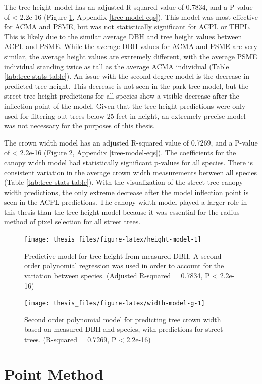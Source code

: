 \documentclass[12pt,twoside]{reedthesis}
\begin{document}
The tree height model has an adjusted R-squared value of 0.7834, and a P-value of \textless{} 2.2e-16 (Figure \ref{fig:height-model}, Appendix \ref{tree-model-eqs}). This model was most effective for ACMA and PSME, but was not statistically significant for ACPL or THPL. This is likely due to the similar average DBH and tree height values between ACPL and PSME. While the average DBH values for ACMA and PSME are very similar, the average height values are extremely different, with the average PSME individual standing twice as tall as the average ACMA individual (Table \ref{tab:tree-stats-table}). An issue with the second degree model is the decrease in predicted tree height. This decrease is not seen in the park tree model, but the street tree height predictions for all species show a visible decrease after the inflection point of the model. Given that the tree height predictions were only used for filtering out trees below 25 feet in height, an extremely precise model was not necessary for the purposes of this thesis.

The crown width model has an adjusted R-squared value of 0.7269, and a P-value of \textless{} 2.2e-16 (Figure \ref{fig:width-model-g}, Appendix \ref{tree-model-eqs}). The coefficients for the canopy width model had statistically significant p-values for all species. There is consistent variation in the average crown width measurements between all species (Table \ref{tab:tree-stats-table}). With the visualization of the street tree canopy width predictions, the only extreme decrease after the model inflection point is seen in the ACPL predictions. The canopy width model played a larger role in this thesis than the tree height model because it was essential for the radius method of pixel selection for all street trees.
\begin{figure}

{\centering \texttt{[image: thesis\_files/figure-latex/height-model-1]} 

}

\caption[Tree height predictive model]{Predictive model for tree height from measured DBH. A second order polynomial regression was used in order to account for the variation between species. (Adjusted R-squared = 0.7834, P < 2.2e-16)}\label{fig:height-model}
\end{figure}
\begin{figure}

{\centering \texttt{[image: thesis\_files/figure-latex/width-model-g-1]} 

}

\caption[Crown width predictive model]{Second order polynomial model for predicting tree crown width based on measured DBH and species, with predictions for street trees. (R-squared = 0.7269,  P < 2.2e-16)}\label{fig:width-model-g}
\end{figure}
\hypertarget{point-method-1}{%
\section{Point Method}\label{point-method-1}}
\end{document}
